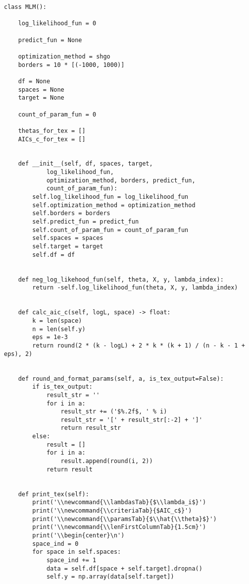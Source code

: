 \begin{verbatim}
class MLM():
    
    log_likelihood_fun = 0
    
    predict_fun = None
    
    optimization_method = shgo
    borders = 10 * [(-1000, 1000)]
    
    df = None
    spaces = None
    target = None
    
    count_of_param_fun = 0
    
    thetas_for_tex = []
    AICs_c_for_tex = []
    
    
    def __init__(self, df, spaces, target,
            log_likelihood_fun,
            optimization_method, borders, predict_fun,
            count_of_param_fun):
        self.log_likelihood_fun = log_likelihood_fun
        self.optimization_method = optimization_method
        self.borders = borders
        self.predict_fun = predict_fun
        self.count_of_param_fun = count_of_param_fun
        self.spaces = spaces
        self.target = target
        self.df = df
    
    
    def neg_log_likehood_fun(self, theta, X, y, lambda_index):
        return -self.log_likelihood_fun(theta, X, y, lambda_index)
    
    
    def calc_aic_c(self, logL, space) -> float:
        k = len(space)
        n = len(self.y)
        eps = 1e-3
        return round(2 * (k - logL) + 2 * k * (k + 1) / (n - k - 1 + eps), 2)
    
    
    def round_and_format_params(self, a, is_tex_output=False):
        if is_tex_output:
            result_str = ''
            for i in a:
                result_str += ('$%.2f$, ' % i)
                result_str = '[' + result_str[:-2] + ']'
                return result_str
        else:
            result = []
            for i in a:
                result.append(round(i, 2))
            return result
    
    
    def print_tex(self):    
        print('\\newcommand{\\lambdasTab}{$\\lambda_i$}')
        print('\\newcommand{\\criteriaTab}{$AIC_c$}')
        print('\\newcommand{\\paramsTab}{$\\hat{\\theta}$}')
        print('\\newcommand{\\lenFirstColumnTab}{1.5cm}')
        print('\\begin{center}\n')
        space_ind = 0
        for space in self.spaces:
            space_ind += 1
            data = self.df[space + self.target].dropna()
            self.y = np.array(data[self.target])
            

\end{verbatim}
